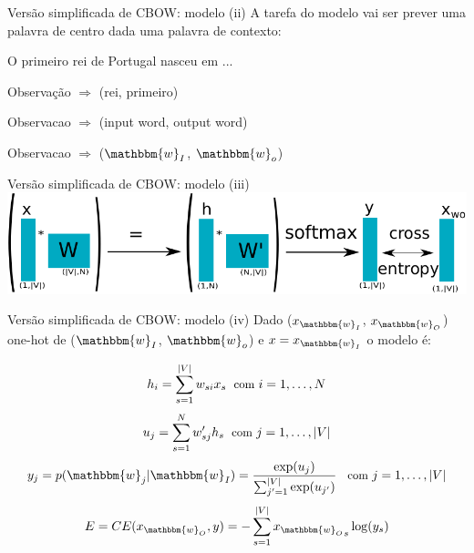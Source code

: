 \documentclass{beamer}
\newcommand{\wo}{\mathbbm{w}}
\begin{document}
\begin{frame}[fragile]{Versão simplificada de CBOW: modelo  (ii)}
A tarefa do modelo vai ser prever uma palavra de centro dada uma palavra de contexto:

\begin{center}
{\color{red!89}O} {\color{blue!89}primeiro} {\color{red!89}rei} de Portugal nasceu em ...
\end{center}
\vspace{0.1cm}
Observação $\Rightarrow$ (rei, primeiro)\\

\vspace{0.1cm}

{\color{white!89}Observacao } $\Rightarrow$ (input word, output word)\\

\vspace{0.1cm}

{\color{white!89}Observacao } $\Rightarrow$ ($\wo_{I}$, $\wo_{o}$)
\end{frame}

\begin{frame}[fragile]{Versão simplificada de CBOW: modelo  (iii)}
\includegraphics[scale=0.8]{simple_model.pdf}
\end{frame}

\begin{frame}[fragile]{Versão simplificada de CBOW: modelo  (iv)}
Dado ($x_{\wo_I}$, $x_{\wo_O}$) one-hot de ($\wo_{I}$, $\wo_{o}$) e $x=x_{\wo_I}$ o modelo é:

\begin{equation}\label{eq:1}
h_i = \sum_{s=1}^{|V|}w_{si} x_{s} \; {\small \text{ com }i = 1, \dots, N}
\end{equation}
\begin{equation}\label{eq:2}
u_j = \sum_{s=1}^{N}w^{\prime}_{sj} h_{s} \; {\small \text{ com }j = 1, \dots, |V|}
\end{equation}
\begin{equation}\label{eq:3}
y_j = p(\wo_{j}|\wo_{I}) = \frac{\exp(u_j)}{\sum_{j^{\prime}=1}^{|V|} \exp(u_{j^{\prime}})} \;\; {\small \text{ com }j = 1, \dots, |V|}
\end{equation}
\begin{equation}\label{eq:4}
E = CE(x_{\wo_O},y) = -\sum_{s=1}^{|V|} {x_{\wo_O}}_s  \log(y_s)
\end{equation}
\end{frame}
\end{document}
